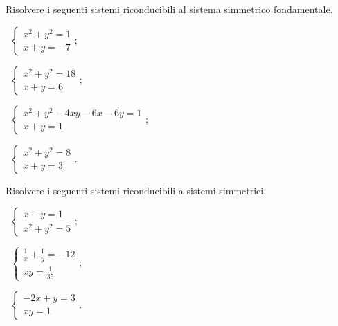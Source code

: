 \begin{esercizio}[\Ast]
\label{ese:6.24}
Risolvere i seguenti sistemi riconducibili al sistema simmetrico fondamentale.
\begin{multicols}{2}
 \begin{enumeratea}
 \item~$\left\{\begin{array}{l}x^2+y^2=1\\x+y=-7\end{array}\right.$;
 \item~$\left\{\begin{array}{l}x^2+y^2=18\\x+y=6 \end{array}\right.$;
 \item~$\left\{\begin{array}{l}x^2+y^2-4xy-6x-6y=1\\x+y=1 \end{array}\right.$;
 \item~$\left\{\begin{array}{l}x^2+y^2=8\\x+y=3\end{array}\right.$.
 \end{enumeratea}
 \end{multicols}
\end{esercizio}
\newpage
\begin{esercizio}[\Ast]
\label{ese:6.25}
Risolvere i seguenti sistemi riconducibili a sistemi simmetrici.
\begin{multicols}{3}
 \begin{enumeratea}
 \item~$\left\{\begin{array}{l}{x-y=1}\\{x^2+y^2=5}\end{array}\right.$;
 \item~$\left\{\begin{array}{l}{\frac 1 x+\frac 1 y=-12}\\{{xy}=\frac 1{35}}\end{array}\right.$;
 \item~$\left\{\begin{array}{l}{-2x+y=3}\\{{xy}=1}\end{array}\right.$.
 \end{enumeratea}
 \end{multicols}
\end{esercizio}

